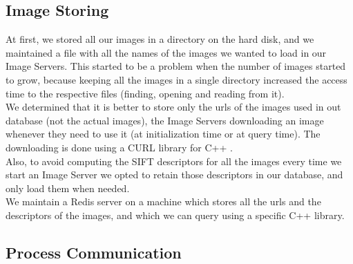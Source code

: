 \subsection{Image Storing}

At first, we stored all our images in a directory on the hard disk, and we maintained a file with all the names of the images we wanted to load in our Image Servers.
This started to be a problem when the number of images started to grow, because keeping all the images in a single directory increased the access time to the respective files (finding, opening and reading from it).\\

We determined that it is better to store only the urls of the images used in out database (not the actual images), the Image Servers downloading an image whenever they need to use it (at initialization time or at query time). The downloading is done using a CURL library for C++ \cite{libcurl}.\\
Also, to avoid computing the SIFT descriptors for all the images every time we start an Image Server we opted to retain those descriptors in our database, and only load them when needed.\\
We maintain a Redis server \cite{redis} on a machine which stores all the urls and the descriptors of the images, and which we can query using a specific C++ library.

\subsection{Process Communication}

